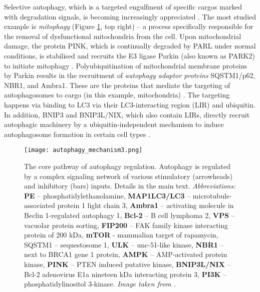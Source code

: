     Selective autophagy, which is a targeted engulfment of specific cargos marked with degradation signals, is becoming increasingly appreciated \cite{Kaur2015}. The most studied example is \textit{mitophagy} (Figure \ref{fig:corepath}, top right) -- a process specifically responsible for the removal of dysfunctional mitochondria from the cell.
    Upon mitochondrial damage, the protein PINK, which is continually degraded by PARL under normal conditions, is stabilised and recruits the E3 ligase Parkin (also known as PARK2) to initiate mitophagy \cite{Kroemer2010}. Polyubiquitination of mitochondrial membrane proteins by Parkin results in the recruitment of \textit{autophagy adaptor proteins} SQSTM1/p62, NBR1, and Ambra1. These are the proteins that mediate the targeting of autophagosomes to cargo (in this example, mitochondria) \cite{Kaur2015}. The targeting happens via binding to LC3 via their LC3-interacting region (LIR) and ubiquitin. In addition, BNIP3 and BNIP3L/NIX, which also contain LIRs, directly recruit autophagic machinery by a ubiquitin-independent mechanism to induce autophagosome formation in certain cell types \cite{Kroemer2010}.\\
    
    
     
        
             \begin{figure}[!h]
            \centering
            \texttt{[image: autophagy\_mechanism3.png]}
            \caption[Autophagy core pathway mechanism]{The core pathway of autophagy regulation. Autophagy is regulated by a complex signaling network of various stimulatory (arrowheads) and inhibitory (bars) inputs. Details in the main text. \textit{Abbreviations:} \textbf{PE} -- phosphatidylethanolamine, \textbf{MAP1LC3/LC3} -- microtubule-associated protein 1 light chain 3, \textbf{Ambra1} -- activating molecule in Beclin 1-regulated autophagy 1, \textbf{Bcl-2} -- B cell lymphoma 2, \textbf{VPS} -- vacuolar protein sorting, \textbf{FIP200} -- FAK family kinase interacting protein of 200 kDa, \textbf{mTOR} - mammalian target of rapamycin, SQSTM1 -- sequestosome 1, \textbf{ULK} -- unc-51-like kinase, \textbf{NBR1} -- next to BRCA1 gene 1 protein, \textbf{AMPK} -- AMP-activated protein kinase, \textbf{PINK} -- PTEN induced putative kinase, \textbf{BNIP3L/NIX} -- Bcl-2 adenovirus E1a nineteen kDa interacting protein 3, \textbf{PI3K} -- phosphatidylinositol 3-kinase. \textit{Image taken from \cite{AutophagyTechnology}.}
            }
            \label{fig:corepath}
            \end{figure} 

